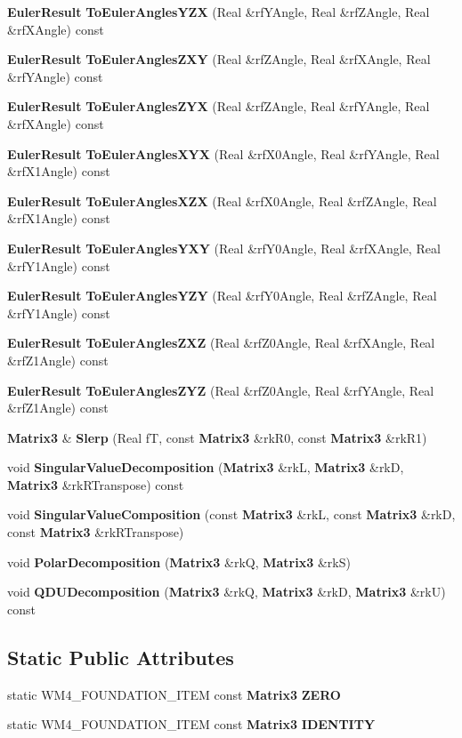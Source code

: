 \begin{CompactItemize}
{\bf Euler\-Result} {\bf To\-Euler\-Angles\-YZX} (Real \&rf\-YAngle, Real \&rf\-ZAngle, Real \&rf\-XAngle) const
\item 
{\bf Euler\-Result} {\bf To\-Euler\-Angles\-ZXY} (Real \&rf\-ZAngle, Real \&rf\-XAngle, Real \&rf\-YAngle) const
\item 
{\bf Euler\-Result} {\bf To\-Euler\-Angles\-ZYX} (Real \&rf\-ZAngle, Real \&rf\-YAngle, Real \&rf\-XAngle) const
\item 
{\bf Euler\-Result} {\bf To\-Euler\-Angles\-XYX} (Real \&rf\-X0Angle, Real \&rf\-YAngle, Real \&rf\-X1Angle) const
\item 
{\bf Euler\-Result} {\bf To\-Euler\-Angles\-XZX} (Real \&rf\-X0Angle, Real \&rf\-ZAngle, Real \&rf\-X1Angle) const
\item 
{\bf Euler\-Result} {\bf To\-Euler\-Angles\-YXY} (Real \&rf\-Y0Angle, Real \&rf\-XAngle, Real \&rf\-Y1Angle) const
\item 
{\bf Euler\-Result} {\bf To\-Euler\-Angles\-YZY} (Real \&rf\-Y0Angle, Real \&rf\-ZAngle, Real \&rf\-Y1Angle) const
\item 
{\bf Euler\-Result} {\bf To\-Euler\-Angles\-ZXZ} (Real \&rf\-Z0Angle, Real \&rf\-XAngle, Real \&rf\-Z1Angle) const
\item 
{\bf Euler\-Result} {\bf To\-Euler\-Angles\-ZYZ} (Real \&rf\-Z0Angle, Real \&rf\-YAngle, Real \&rf\-Z1Angle) const
\item 
{\bf Matrix3} \& {\bf Slerp} (Real f\-T, const {\bf Matrix3} \&rk\-R0, const {\bf Matrix3} \&rk\-R1)
\item 
void {\bf Singular\-Value\-Decomposition} ({\bf Matrix3} \&rk\-L, {\bf Matrix3} \&rk\-D, {\bf Matrix3} \&rk\-RTranspose) const
\item 
void {\bf Singular\-Value\-Composition} (const {\bf Matrix3} \&rk\-L, const {\bf Matrix3} \&rk\-D, const {\bf Matrix3} \&rk\-RTranspose)
\item 
void {\bf Polar\-Decomposition} ({\bf Matrix3} \&rk\-Q, {\bf Matrix3} \&rk\-S)
\item 
void {\bf QDUDecomposition} ({\bf Matrix3} \&rk\-Q, {\bf Matrix3} \&rk\-D, {\bf Matrix3} \&rk\-U) const
\end{CompactItemize}
\subsection*{Static Public Attributes}
\begin{CompactItemize}
\item 
static WM4\_\-FOUNDATION\_\-ITEM const {\bf Matrix3} {\bf ZERO}
\item 
static WM4\_\-FOUNDATION\_\-ITEM const {\bf Matrix3} {\bf IDENTITY}
\end{CompactItemize}
